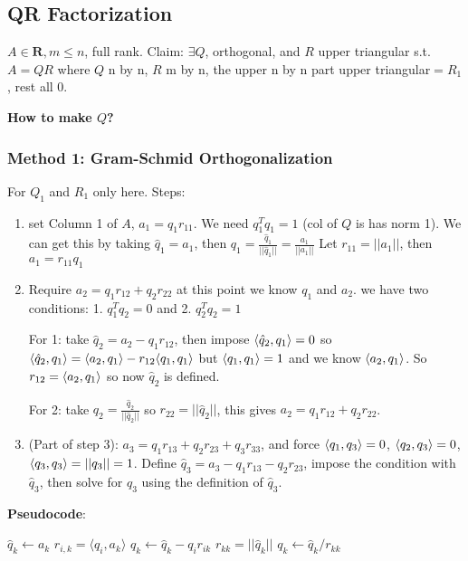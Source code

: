 \subsection{QR Factorization}
\label{sec:QR2}

$A\in \mathbf{R}, m\le n$, full rank. Claim: $\exists Q$, orthogonal,
and $R$ upper triangular s.t. $A=QR$ where $Q$ n by n, $R$ m by n, the
upper n by n part upper triangular$=R_1$, rest all 0.

\textbf{How to make $Q$?}

\subsubsection{Method 1: Gram-Schmid Orthogonalization}
For $Q_1$ and $R_1$ only here.
Steps:
\begin{enumerate}
\item set Column 1 of $A$, $a_1 = q_1r_{11}$. We need $q_1^Tq_1= 1$
  (col of $Q$ is has norm 1). We can get this by taking $\hat q_1 =
  a_1$, then $q_1=\frac{\hat q_1}{||\hat q_1 ||} = \frac{a_1}{||a_1||}
  $
Let $r_{11} = ||a_1||$, then $a_1 =r_{11}q_1$
\item Require $a_2 = q_{1}r_{12} + q_2r_{22}$ at this point we know
  $q_1$ and $a_2$. we have two conditions: 1. $q_1^Tq_2= 0$ and
  2. $q_2^Tq_2 = 1$


For 1: take $\hat q_2 = a_2 - q_1r_{12}$, then impose $\langle \hat q_2,
q_1\rangle = 0$ so $\langle \hat q_2,
q_1\rangle = \langle a_2, q_1\rangle  - r_{12}\langle q_1, q_1\rangle $ but $\langle q_1, q_1\rangle =1$ and we know
$\langle a_2, q_1\rangle $. So $r_{12} = \langle a_2, q_1\rangle $ so now $\hat q_2$ is defined. 

For 2: take $q_2 = \frac{\hat q_2}{||\hat q_2||}$ so $r_{22} = ||\hat
q_2||$, this gives $a_2 = q_{1}r_{12} + q_2r_{22}$.
\item (Part of step 3): $a_3 = q_1r_{13} + q_2r_{23} + q_3r_{33}$, and
  force $\langle q_1, q_3\rangle  =0$, $\langle q_2, q_3\rangle =0$, $\langle q_3, q_3\rangle  = ||q_3|| = 1$.
Define $\hat q_3 = a_3 - q_1r_{13} - q_2r_{23}$, impose the condition
with $\hat q_3$, then solve for $q_3$ using the definition of $\hat q_3$.
\end{enumerate}

\textbf{Pseudocode}:
\begin{algorithmic}
  \STATE $\hat q_k \gets a_k$
     \STATE $r_{i,k} = \langle q_i, a_k \rangle$
     \STATE $q_k \gets \hat q_k - q_i r_{ik}$
  \ENDFOR
  \STATE $r_{kk} = ||\hat q_k||$
  \STATE $q_k \gets \hat q_k/r_{kk}$
\ENDFOR
\end{algorithmic}


